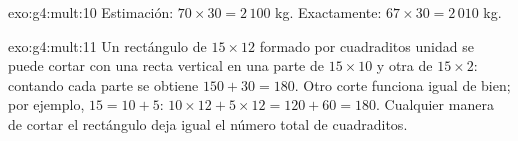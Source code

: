 \begin{solution}{exo:g4:mult:10}
Estimación: $70 \times 30 = 2\,100$ kg. Exactamente:
$67 \times 30 = 2\,010$ kg.
\end{solution}

\begin{solution}{exo:g4:mult:11}
Un rectángulo de $15 \times 12$ formado por cuadraditos unidad se puede cortar con una recta
vertical en una parte de $15 \times 10$ y otra de $15 \times 2$: contando
cada parte se obtiene $150 + 30 = 180$. Otro corte funciona igual de bien;
por ejemplo, $15 = 10 + 5$: $10 \times 12 + 5 \times 12 = 120 + 60
= 180$. Cualquier manera de cortar el rectángulo deja igual el número total
de cuadraditos.
\end{solution}
